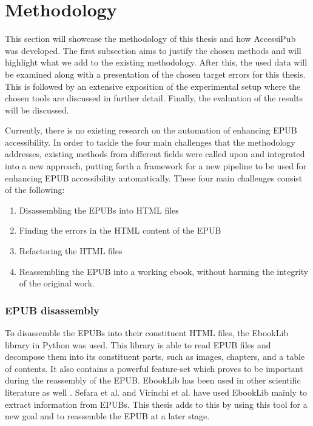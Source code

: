 \section{Methodology}
\label{sec:methodology}
This section will showcase the methodology of this thesis and how AccessiPub was developed. The first subsection aims to justify the chosen methods and will highlight what we add to the existing methodology. After this, the used data will be examined along with a presentation of the chosen target errors for this thesis. This is followed by an extensive exposition of the experimental setup where the chosen tools are discussed in further detail. Finally, the evaluation of the results will be discussed.

Currently, there is no existing research on the automation of enhancing EPUB accessibility. In order to tackle the four main challenges that the methodology addresses, existing methods from different fields were called upon and integrated into a new approach, putting forth a framework for a new pipeline to be used for enhancing EPUB accessibility automatically. These four main challenges consist of the following:\\

\begin{enumerate}
\item Disassembling the EPUBs into HTML files
\item Finding the errors in the HTML content of the EPUB
\item Refactoring the HTML files
\item Reassembling the EPUB into a working ebook, without harming the integrity of the original work.\\
\end{enumerate}


\subsubsection{EPUB disassembly}
\noindent To disassemble the EPUBs into their constituent HTML files, the EbookLib library in Python was used. This library is able to read EPUB files and decompose them into its constituent parts, such as images, chapters, and a table of contents. It also contains a powerful feature-set which proves to be important during the reassembly of the EPUB. EbookLib has been used in other scientific literature as well \cite{SefaraTextExtraction, VirinchiBrailleCloud}. Sefara et al. and Virinchi et al. have used EbookLib mainly to extract information from EPUBs. This thesis adds to this by using this tool for a new goal and to reassemble the EPUB at a later stage.


